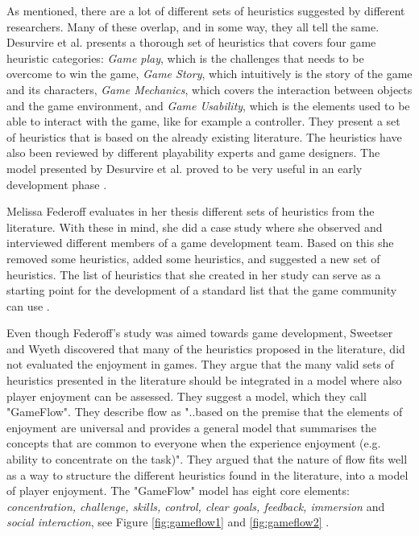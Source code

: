 As mentioned, there are a lot of different sets of heuristics suggested by different researchers. Many of these overlap, and in some way, they all tell the same.  Desurvire et al. presents a thorough set of heuristics that covers four game heuristic categories:  \emph{Game play}, which is the challenges that needs to be overcome to win the game, \emph{Game Story}, which intuitively is the story of the game and its characters, \emph{Game Mechanics}, which covers the interaction between objects and the game environment, and  \emph{Game Usability}, which is the elements used to be able to interact with the game, like for example a controller. They present a set of heuristics that is based on the already existing literature. The heuristics have also been reviewed by different playability experts and game designers. The model presented by Desurvire et al. proved to be very useful in an early development phase \cite{desurvire}.

Melissa Federoff evaluates in her thesis different sets of heuristics from the literature. With these in mind, she did a case study where she observed and interviewed different members of a game development team. Based on this she removed some heuristics, added some heuristics, and  suggested a new set of heuristics. The list of heuristics that she created in her study can serve as a starting point for the development of a standard list that the game community can use  \cite{federoff}. 

Even though Federoff's study was aimed towards game development, Sweetser and Wyeth discovered that many of the heuristics proposed in the literature, did not evaluated the enjoyment in games. They argue that the many valid sets of heuristics presented in the literature should be integrated in a model where also player enjoyment can be assessed. They suggest a model, which they call "GameFlow". They describe flow as "..based on the premise that the elements of enjoyment are universal and provides a general model that summarises the concepts that are common to everyone when the experience enjoyment (e.g. ability to concentrate on the task)". They argued that the nature of flow fits well as a way to structure the different heuristics found in the literature, into a model of player enjoyment. The "GameFlow" model has eight core elements: \emph{concentration, challenge, skills, control, clear goals, feedback, immersion} and \emph{social interaction}, see Figure \ref{fig:gameflow1} and \ref{fig:gameflow2} \cite{sweetser}. 

